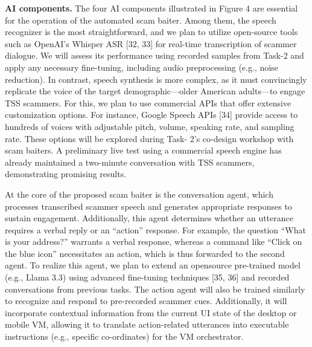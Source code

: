\textbf{AI components.} The four AI components illustrated in Figure 4 are essential for the operation
of the automated scam baiter. Among them, the speech recognizer is the most straightforward, and we
plan to utilize open-source tools such as OpenAI's Whisper ASR [32, 33] for real-time transcription of
scammer dialogue. We will assess its performance using recorded samples from Task-2 and apply any
necessary fine-tuning, including audio preprocessing (e.g., noise reduction). In contrast, speech synthesis
is more complex, as it must convincingly replicate the voice of the target demographic—older American
adults—to engage TSS scammers. For this, we plan to use commercial APIs that offer extensive
customization options. For instance, Google Speech APIs [34] provide access to hundreds of voices with
adjustable pitch, volume, speaking rate, and sampling rate. These options will be explored during Task-
2’s co-design workshop with scam baiters. A preliminary live test using a commercial speech engine has
already maintained a two-minute conversation with TSS scammers, demonstrating promising results.

At the core of the proposed scam baiter is the conversation agent, which processes transcribed scammer
speech and generates appropriate responses to sustain engagement. Additionally, this agent determines
whether an utterance requires a verbal reply or an “action” response. For example, the question “What is
your address?” warrants a verbal response, whereas a command like “Click on the blue icon” necessitates
an action, which is thus forwarded to the second agent. To realize this agent, we plan to extend an opensource
pre-trained model (e.g., Llama 3.3) using advanced fine-tuning techniques [35, 36] and recorded
conversations from previous tasks. The action agent will also be trained similarly to recognize and
respond to pre-recorded scammer cues. Additionally, it will incorporate contextual information from the
current UI state of the desktop or mobile VM, allowing it to translate action-related utterances into
executable instructions (e.g., specific co-ordinates) for the VM orchestrator.


